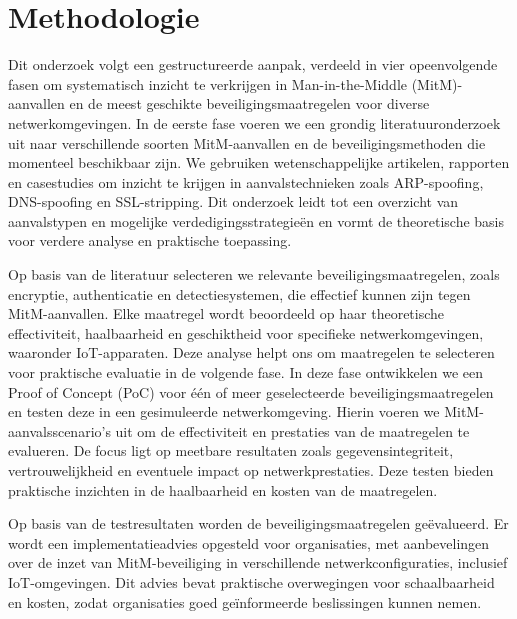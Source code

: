 \section{Methodologie}%
\label{sec:methodologie}
Dit onderzoek volgt een gestructureerde aanpak, verdeeld in vier opeenvolgende fasen om systematisch inzicht te verkrijgen in Man-in-the-Middle (MitM)-aanvallen en de meest geschikte beveiligingsmaatregelen voor diverse netwerkomgevingen.
\vspace{0.5cm}
In de eerste fase voeren we een grondig literatuuronderzoek uit naar verschillende soorten MitM-aanvallen en de beveiligingsmethoden die momenteel beschikbaar zijn. We gebruiken wetenschappelijke artikelen, rapporten en casestudies om inzicht te krijgen in aanvalstechnieken zoals ARP-spoofing, DNS-spoofing en SSL-stripping. Dit onderzoek leidt tot een overzicht van aanvalstypen en mogelijke verdedigingsstrategieën en vormt de theoretische basis voor verdere analyse en praktische toepassing.
\vspace{0.5cm}

Op basis van de literatuur selecteren we relevante beveiligingsmaatregelen, zoals encryptie, authenticatie en detectiesystemen, die effectief kunnen zijn tegen MitM-aanvallen. Elke maatregel wordt beoordeeld op haar theoretische effectiviteit, haalbaarheid en geschiktheid voor specifieke netwerkomgevingen, waaronder IoT-apparaten. Deze analyse helpt ons om maatregelen te selecteren voor praktische evaluatie in de volgende fase.
\vspace{0.5cm}
In deze fase ontwikkelen we een Proof of Concept (PoC) voor één of meer geselecteerde beveiligingsmaatregelen en testen deze in een gesimuleerde netwerkomgeving. Hierin voeren we MitM-aanvalsscenario's uit om de effectiviteit en prestaties van de maatregelen te evalueren. De focus ligt op meetbare resultaten zoals gegevensintegriteit, vertrouwelijkheid en eventuele impact op netwerkprestaties. Deze testen bieden praktische inzichten in de haalbaarheid en kosten van de maatregelen.


Op basis van de testresultaten worden de beveiligingsmaatregelen geëvalueerd. Er wordt een implementatieadvies opgesteld voor organisaties, met aanbevelingen over de inzet van MitM-beveiliging in verschillende netwerkconfiguraties, inclusief IoT-omgevingen. Dit advies bevat praktische overwegingen voor schaalbaarheid en kosten, zodat organisaties goed geïnformeerde beslissingen kunnen nemen.
\vspace{0.5cm}

